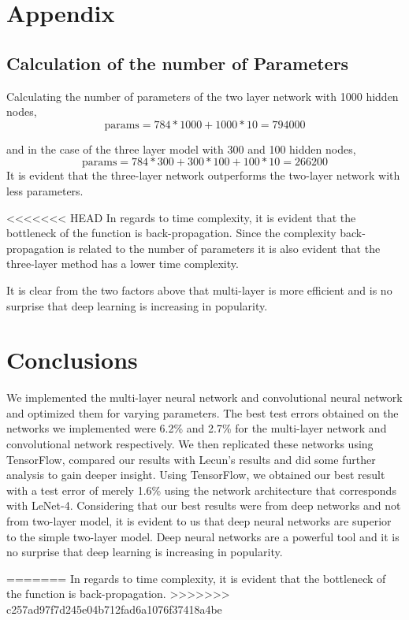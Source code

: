 \documentclass[12pt, twocolumn]{article}
\begin{document}


\section{Appendix}
\subsection{Calculation of the number of Parameters}
 Calculating the number of parameters of the two layer network with 1000 hidden nodes, 
\begin{equation*}
\textrm{params} = 784*1000 + 1000* 10 = 794000
\end{equation*}

and in the case of the three layer model with 300 and 100 hidden nodes,
\begin{equation*}
\textrm{params} = 784*300 + 300*100 + 100* 10 = 266200
\end{equation*}
It is evident that the three-layer network outperforms the two-layer network with less parameters. 

<<<<<<< HEAD
In regards to time complexity, it is evident that the bottleneck of the function is back-propagation. Since the complexity back-propagation is related to the number of parameters it is also evident that the three-layer method has a lower time complexity.

It is clear from the two factors above that multi-layer is more efficient and is no surprise that deep learning is increasing in popularity.


\section{Conclusions}
We implemented the multi-layer neural network and convolutional neural network and optimized them for varying parameters. The best test errors obtained on the networks we implemented were 6.2\% and 2.7\% for the multi-layer network and convolutional network respectively. We then replicated these networks using TensorFlow, compared our results with Lecun's results and did some further analysis to gain deeper insight.
 Using TensorFlow, we obtained our best result with a test error of merely 1.6\% using the network architecture that corresponds with LeNet-4. Considering that our best results were from deep networks and not from two-layer model, it is evident to us that deep neural networks are superior to the simple two-layer model. Deep neural networks are a powerful tool and it is no surprise that deep learning is increasing in popularity.



=======
In regards to time complexity, it is evident that the bottleneck of the function is back-propagation. 
>>>>>>> c257ad97f7d245e04b712fad6a1076f37418a4be
\end{document}

